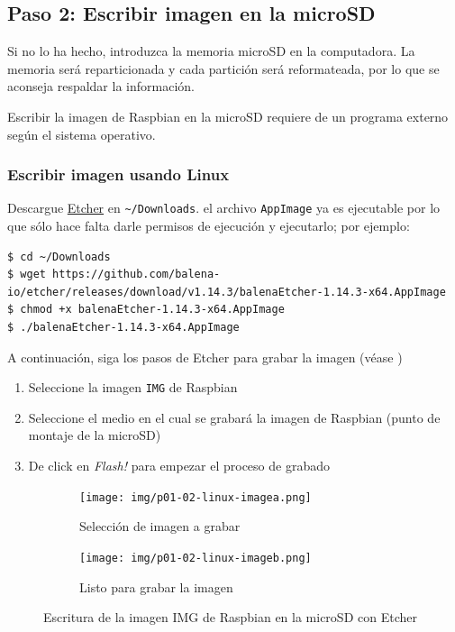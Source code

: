 \documentclass[letterpaper,10.5pt]{article}
\begin{document}
%
%
\subsection{Paso 2: Escribir imagen en la microSD}%
\label{sec:step2}
Si no lo ha hecho, introduzca la memoria microSD en la computadora.
La memoria será reparticionada y cada partición será reformateada, por lo que se aconseja respaldar la información.

Escribir la imagen de Raspbian en la microSD requiere de un programa externo según el sistema operativo.

%
%
\subsubsection{Escribir imagen usando Linux}%
Descargue \href{https://etcher.io/}{Etcher} en \texttt{\textasciitilde/Downloads}.
el archivo \texttt{AppImage} ya es ejecutable por lo que sólo hace falta darle permisos de ejecución y ejecutarlo; por ejemplo:

\begin{Verbatim}[fontsize=\footnotesize]
$ cd ~/Downloads
$ wget https://github.com/balena-io/etcher/releases/download/v1.14.3/balenaEtcher-1.14.3-x64.AppImage
$ chmod +x balenaEtcher-1.14.3-x64.AppImage
$ ./balenaEtcher-1.14.3-x64.AppImage
\end{Verbatim}


A continuación, siga los pasos de Etcher para grabar la imagen (véase )
\begin{enumerate}[noitemsep]
	\item Seleccione la imagen \texttt{IMG} de Raspbian
	\item Seleccione el medio en el cual se grabará la imagen de Raspbian (punto de montaje de la microSD)
	\item De click en \emph{Flash!} para empezar el proceso de grabado
\end{enumerate}

\begin{figure}[H]
	\centering%
	\begin{subfigure}[b]{0.5\linewidth}
		\centering
		\texttt{[image: img/p01-02-linux-imagea.png]} %
		\caption{Selección de imagen a grabar}
		\label{fig:write-image-linux-a} %
	\end{subfigure}%
	\begin{subfigure}[b]{0.5\linewidth}
		\centering
		\texttt{[image: img/p01-02-linux-imageb.png]} %
		\caption{Listo para grabar la imagen}
		\label{fig:write-image-linux-b} %
	\end{subfigure}
	\caption{Escritura de la imagen IMG de Raspbian en la microSD con Etcher}%
	\label{fig:write-image-linux} %
\end{figure}
\end{document}
